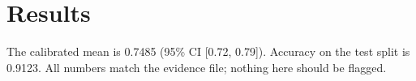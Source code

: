 \section{Results}
The calibrated mean is 0.7485 (95\% CI [0.72, 0.79]). Accuracy on the test
split is 0.9123. All numbers match the evidence file; nothing here should be
flagged.
